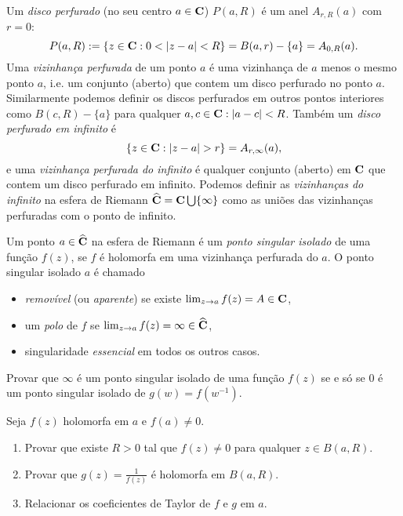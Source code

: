 \begin{defin}
Um \emph{disco perfurado} (no seu centro $a\in\mathbf{C}$)
$P(a,R)$ é um anel $A_{r,R}(a)$ com $r=0$:
\begin{equation}
\label{eq:perfurado}
P(a,R) := \{z\in\C: 0<|z-a|<R\} = B(a,r) -\{a\} = A_{0,R}(a).
\end{equation}
Uma \emph{vizinhança perfurada} de um ponto $a$ é uma vizinhança de $a$
menos o mesmo ponto $a$, i.e. um conjunto (aberto) que contem
um disco perfurado no ponto $a$.
Similarmente podemos definir os discos perfurados em outros pontos interiores
como $B(c,R) - \{a\}$ para qualquer $a,c\in \mathbf{C}: |a-c|<R$.
Também um \emph{disco perfurado em infinito} é 
\begin{equation}
\label{eq:perfurado-infty}
\{z\in\C: |z-a|>r\} = A_{r,\infty}(a),
\end{equation}
e uma \emph{vizinhança perfurada do infinito} é qualquer conjunto (aberto) em $\mathbf{C}$
que contem um disco perfurado em infinito.
Podemos definir as \emph{vizinhanças do infinito} na esfera de Riemann
$\widehat{\mathbf{C}} = \mathbf{C} \bigcup \{\infty\}$ como as uniões
das vizinhanças perfuradas com o ponto de infinito.
\end{defin}

\begin{defin}
\label{d:isolado}
Um ponto $a\in\widehat{\mathbf{C}}$ na esfera de Riemann é um \emph{ponto singular isolado}
de uma função $f(z)$, se $f$ é holomorfa em uma
vizinhança perfurada do $a$. O ponto singular isolado $a$ é chamado
\begin{itemize}
\item \label{d:removivel} \emph{removível} (ou \emph{aparente})
se existe $\lim_{z\to a} f(z) = A \in \mathbf{C}$,
\item \label{d:polo} um \emph{polo} de $f$ se $\lim_{z\to a} f(z) = \infty \in \widehat{\mathbf{C}}$,
\item \label{d:essencial} singularidade \emph{essencial} em todos os outros casos.
\end{itemize}
\end{defin}

\begin{problema}
Provar que $\infty$ é um ponto singular isolado de uma função $f(z)$
se e só se $0$ é um ponto singular isolado de $g(w) = f(w^{-1})$.
\end{problema}

\begin{problema}
Seja $f(z)$ holomorfa em $a$ e $f(a)\neq 0$.
\begin{enumerate}
\item Provar que existe $R>0$
tal que $f(z)\neq 0$ para qualquer $z\in B(a,R)$.
\item Provar que $g(z) = \frac{1}{f(z)}$ é holomorfa em $B(a,R)$.
\item Relacionar os coeficientes de Taylor de $f$ e $g$ em $a$.
\end{enumerate}
\end{problema}


